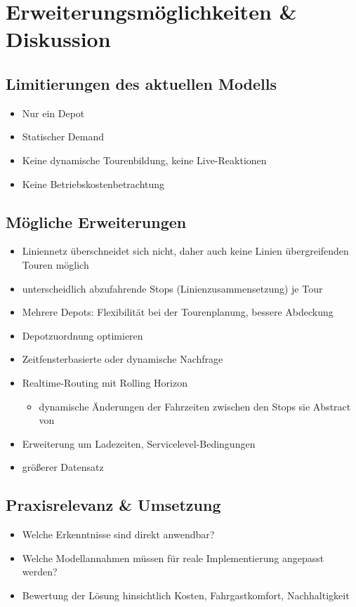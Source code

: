 \chapter{Erweiterungsmöglichkeiten \& Diskussion}
\label{chapter:6}
\section{Limitierungen des aktuellen Modells}
\begin{itemize}
    \item Nur ein Depot
    \item Statischer Demand
    \item Keine dynamische Tourenbildung, keine Live-Reaktionen
    \item Keine Betriebskostenbetrachtung
\end{itemize}

\section{Mögliche Erweiterungen}
\begin{itemize}
    \item Liniennetz überschneidet sich nicht, daher auch keine Linien übergreifenden Touren möglich
    \item unterscheidlich abzufahrende Stops (Linienzusammensetzung) je Tour
    \item Mehrere Depots: Flexibilität bei der Tourenplanung, bessere Abdeckung
    \item Depotzuordnung optimieren
    \item Zeitfensterbasierte oder dynamische Nachfrage
    \item Realtime-Routing mit Rolling Horizon
    \begin{itemize}
        \item dynamische Änderungen der Fahrzeiten zwischen den Stops sie Abstract von \textcite{lian_-demand_2023} 
    \end{itemize}
    \item Erweiterung um Ladezeiten, Servicelevel-Bedingungen
    \item größerer Datensatz
\end{itemize}

\section{Praxisrelevanz \& Umsetzung}
\begin{itemize}
    \item Welche Erkenntnisse sind direkt anwendbar?
    \item Welche Modellannahmen müssen für reale Implementierung angepasst werden?
    \item Bewertung der Lösung hinsichtlich Kosten, Fahrgastkomfort, Nachhaltigkeit
\end{itemize}
